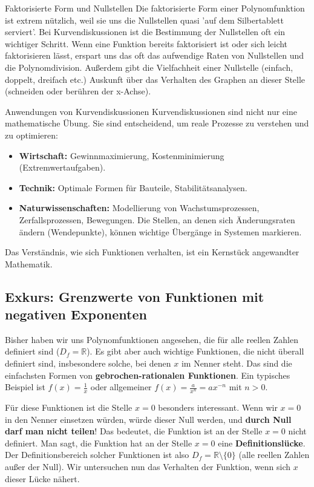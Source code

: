\begin{warumwichtigumgebung}{Faktorisierte Form und Nullstellen}
Die faktorisierte Form einer Polynomfunktion ist extrem nützlich, weil sie uns die Nullstellen quasi 'auf dem Silbertablett serviert'. Bei Kurvendiskussionen ist die Bestimmung der Nullstellen oft ein wichtiger Schritt. Wenn eine Funktion bereits faktorisiert ist oder sich leicht faktorisieren lässt, erspart uns das oft das aufwendige Raten von Nullstellen und die Polynomdivision.
Außerdem gibt die Vielfachheit einer Nullstelle (einfach, doppelt, dreifach etc.) Auskunft über das Verhalten des Graphen an dieser Stelle (schneiden oder berühren der x-Achse).
\end{warumwichtigumgebung}

\begin{infoboxumgebung}{Anwendungen von Kurvendiskussionen}
Kurvendiskussionen sind nicht nur eine mathematische Übung. Sie sind entscheidend, um reale Prozesse zu verstehen und zu optimieren:
\begin{itemize}
    \item \textbf{Wirtschaft:} Gewinnmaximierung, Kostenminimierung (Extremwertaufgaben).
    \item \textbf{Technik:} Optimale Formen für Bauteile, Stabilitätsanalysen.
    \item \textbf{Naturwissenschaften:} Modellierung von Wachstumsprozessen, Zerfallsprozessen, Bewegungen. Die Stellen, an denen sich Änderungsraten ändern (Wendepunkte), können wichtige Übergänge in Systemen markieren.
\end{itemize}
Das Verständnis, wie sich Funktionen verhalten, ist ein Kernstück angewandter Mathematik.
\end{infoboxumgebung}

\subsection{Exkurs: Grenzwerte von Funktionen mit negativen Exponenten}
\label{subsec:grenzwerte_neg_exp}

Bisher haben wir uns Polynomfunktionen angesehen, die für alle reellen Zahlen definiert sind ($D_f = \mathbb{R}$). Es gibt aber auch wichtige Funktionen, die nicht überall definiert sind, insbesondere solche, bei denen $x$ im Nenner steht. Das sind die einfachsten Formen von \textbf{gebrochen-rationalen Funktionen}. Ein typisches Beispiel ist $f(x) = \frac{1}{x}$ oder allgemeiner $f(x) = \frac{a}{x^n} = ax^{-n}$ mit $n > 0$.

Für diese Funktionen ist die Stelle $x=0$ besonders interessant. Wenn wir $x=0$ in den Nenner einsetzen würden, würde dieser Null werden, und \textbf{durch Null darf man nicht teilen}! Das bedeutet, die Funktion ist an der Stelle $x=0$ nicht definiert. Man sagt, die Funktion hat an der Stelle $x=0$ eine \textbf{Definitionslücke}. Der Definitionsbereich solcher Funktionen ist also $D_f = \mathbb{R} \setminus \{0\}$ (alle reellen Zahlen außer der Null). Wir untersuchen nun das Verhalten der Funktion, wenn sich $x$ dieser Lücke nähert.

